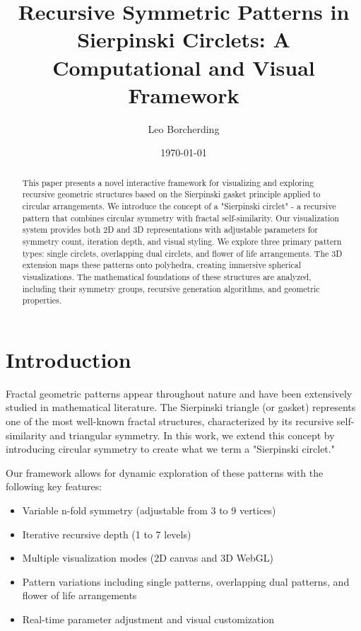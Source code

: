 \documentclass[12pt,a4paper]{article}
\title{Recursive Symmetric Patterns in Sierpinski Circlets: A Computational and Visual Framework}
\author{Leo Borcherding}
\date{\today}
\begin{document}
\maketitle

\begin{abstract}
This paper presents a novel interactive framework for visualizing and exploring recursive geometric structures based on the Sierpinski gasket principle applied to circular arrangements. We introduce the concept of a "Sierpinski circlet" - a recursive pattern that combines circular symmetry with fractal self-similarity. Our visualization system provides both 2D and 3D representations with adjustable parameters for symmetry count, iteration depth, and visual styling. We explore three primary pattern types: single circlets, overlapping dual circlets, and flower of life arrangements. The 3D extension maps these patterns onto polyhedra, creating immersive spherical visualizations. The mathematical foundations of these structures are analyzed, including their symmetry groups, recursive generation algorithms, and geometric properties.
\end{abstract}

\section{Introduction}
Fractal geometric patterns appear throughout nature and have been extensively studied in mathematical literature. The Sierpinski triangle (or gasket) represents one of the most well-known fractal structures, characterized by its recursive self-similarity and triangular symmetry. In this work, we extend this concept by introducing circular symmetry to create what we term a "Sierpinski circlet."

Our framework allows for dynamic exploration of these patterns with the following key features:
\begin{itemize}
    \item Variable n-fold symmetry (adjustable from 3 to 9 vertices)
    \item Iterative recursive depth (1 to 7 levels)
    \item Multiple visualization modes (2D canvas and 3D WebGL)
    \item Pattern variations including single patterns, overlapping dual patterns, and flower of life arrangements
    \item Real-time parameter adjustment and visual customization
\end{itemize}
\end{document}
